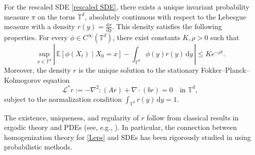 \documentclass[12pt,a4paper,reqno]{amsart}
\numberwithin{equation}{section}
\begin{document}
For the rescaled SDE \eqref{rescaled SDE}, there exists a unique invariant probability measure $\pi$ on the torus $\mathbb{T}^d$, absolutely continuous with respect to the Lebesgue measure with a density $r(y) = \frac{\mathrm{d}\pi}{\mathrm{d}y}$. This density satisfies the following properties. For every $\phi \in C^{\infty}(\mathbb{T}^d)$, there exist constants $K, \rho > 0$ such that 
\begin{equation}\label{Invariant measure}
	\sup_{x \in \mathbb{T}^d} \left|\, \mathbb{E}[\phi(X_t) \mid X_0 = x] - \int_{\mathbb{T}^d} \phi(y) r(y)\, \mathrm{d}y \,\right| \leq K e^{-\rho t}.
\end{equation}
Moreover, the density $r$ is the unique solution to the stationary Fokker--Planck--Kolmogorov equation 
\begin{equation*}
	\mathcal{L}^* r := -\nabla^2 : (A r) + \nabla \cdot (b r) = 0 \quad \text{in } \mathbb{T}^d,
\end{equation*}
subject to the normalization condition $\int_{\mathbb{T}^d} r(y)\,\mathrm{d}y = 1$. 

The existence, uniqueness, and regularity of $r$ follow from classical results in ergodic theory and PDEs (see, e.g.,  \cite{BLP11, PS08}). In particular, the connection between homogenization theory for \eqref{Leps} and SDEs has been rigorously studied in \cite[Chapter 3]{BLP11} using probabilistic methods.
 
\end{document}

